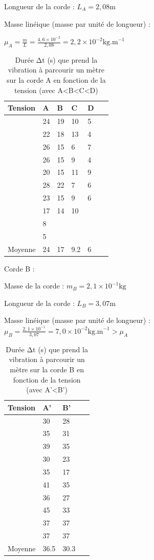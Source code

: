 Longueur de la corde : \(L_A = 2,08 \text{m}\)

Masse linéique (masse par unité de longueur) :

\(\mu_A = \frac{m}{L} = \frac{4,6\times10^{-2}}{2,08} = 2,2\times10^{-2} \text{kg.m}^{-1}\)
\begin{table}
	\centering
	\begin{tabu}[c]{@{}llllll@{}}
		\toprule
		Tension & A & B & C & D \tabularnewline
		\midrule
		& 24 & 19 & 10 & 5 \tabularnewline
		
		& 22 & 18 & 13 & 4 & \  \tabularnewline
		& 26 & 15 & 6 & 7 & \  \tabularnewline
		& 26 & 15 & 9 & 4 & \  \tabularnewline
		& 20 & 15 & 11 & 9 & \  \tabularnewline
		& 28 & 22 & 7 & 6 & \  \tabularnewline
		& 23 & 15 & 9 & 6 & \  \tabularnewline
		& 17 & 14 & 10 & \  & \  \tabularnewline
		& 8 & \  & \  & \  & \  \tabularnewline
		& 5 & \  & \  & \  & \  \tabularnewline
		\midrule
		Moyenne & 24 & 17 & 9.2 & 6 \tabularnewline
		\bottomrule
		
		
	\end{tabu}
	\caption {Durée Δt (s) que prend la vibration à parcourir un mètre sur la corde A en fonction de la tension (avec A<B<C<D)}
\end{table}



Corde B :

Masse de la corde : \(m_B = 2,1\times10^{-1} \text{kg}\)

Longueur de la corde : \(L_B = 3,07 \text{m}\)

Masse linéique (masse par unité de longueur) :
\(\mu_B = \frac{2,1\times10^{-1}}{3,07} = 7,0\times10^{-2} \text{kg.m}^{-1} > \mu_A\)
\begin{table}
	\centering
	\begin{tabu}[c]{@{}llll@{}}
		\toprule
		Tension & A' & B' &  \tabularnewline
		\midrule
		& 30 & 28 & \  \tabularnewline
		& 35 & 31 & \  \tabularnewline
		& 39 & 35 & \  \tabularnewline
		& 30 & 23 & \  \tabularnewline
		& 35 & 17 & \  \tabularnewline
		& 41 & 35 & \  \tabularnewline
		& 36 & 27 & \  \tabularnewline
		& 45 & 33 & \  \tabularnewline
		& 37 & 37 & \  \tabularnewline
		& 37 & 37 & \  \tabularnewline
		\midrule
		Moyenne & 36.5 & 30.3 & \  \tabularnewline
		\bottomrule
	\end{tabu}
	\caption {Durée Δt (s) que prend la vibration à parcourir un mètre sur la corde B en fonction de la tension (avec A'<B')}
\end{table}




